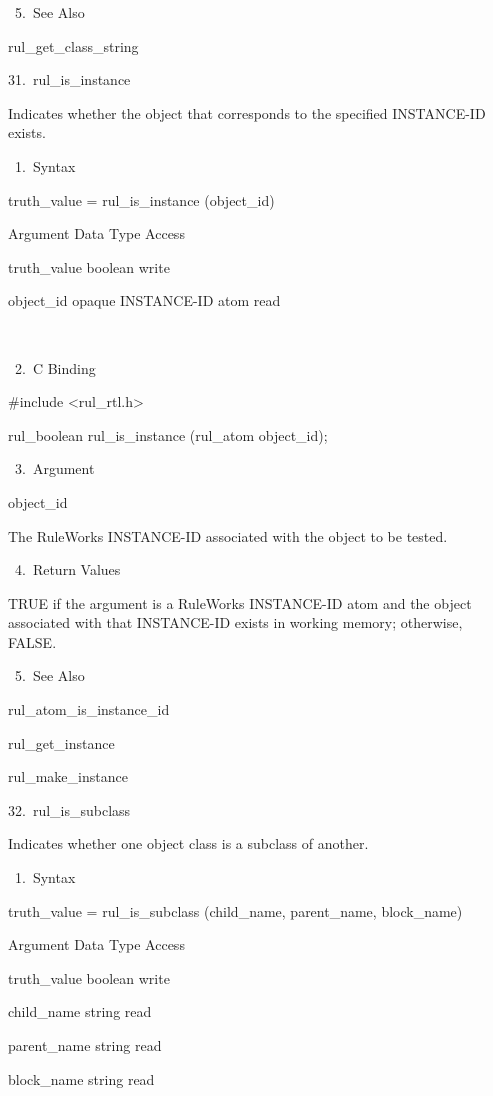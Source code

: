 {       5. See Also

    rul_get_class_string

31. rul_is_instance

    Indicates whether the object that
    corresponds to the specified INSTANCE-ID
    exists.

       1. Syntax

          truth_value = rul_is_instance
          (object_id)

          Argument  Data Type     Access

          truth_value  boolean     write

          object_id  opaque INSTANCE-ID atom
           read

           

       2. C Binding

          #include <rul_rtl.h>

          rul_boolean rul_is_instance
          (rul_atom object_id);

       3. Argument

          object_id

          The RuleWorks INSTANCE-ID associated
          with the object to be tested.

       4. Return Values

          TRUE if the argument is a RuleWorks
          INSTANCE-ID atom and the object
          associated with that INSTANCE-ID
          exists in working memory; otherwise,
          FALSE.

       5. See Also

    rul_atom_is_instance_id

    rul_get_instance

    rul_make_instance

32. rul_is_subclass

    Indicates whether one object class is a
    subclass of another.

       1. Syntax

          truth_value = rul_is_subclass
          (child_name, parent_name,
          block_name)

          Argument  Data Type   Access

          truth_value  boolean   write

          child_name  string   read

          parent_name  string   read

          block_name  string   read

}
